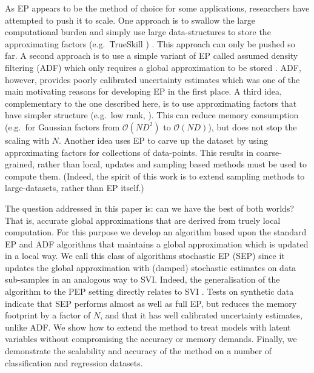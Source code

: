 As EP appears to be the method of choice for some applications, researchers have attempted to push it to scale. One approach is to swallow the large computational burden and simply use large data-structures to store the approximating factors (e.g.~TrueSkill \cite{herbrich:trueskill}) . This approach can only be pushed so far. A second approach is to use a simple variant of EP called assumed density filtering (ADF) which only requires a global approximation to be stored \cite{ADF}. ADF, however, provides poorly calibrated uncertainty estimates \cite{minka:ep} which was one of the main motivating reasons for developing EP in the first place. 
A third idea, complementary to the one described here, is to use approximating factors that have simpler structure (e.g.~low rank, \cite{qi+minka:gp paper}). This can reduce memory consumption (e.g.~for Gaussian factors from $\mathcal{O}(ND^2)$ to $\mathcal{O}(ND)$), but does not stop the scaling with $N$. Another idea uses EP to carve up the dataset \cite{gelman:dep,xu:sms} by using approximating factors for collections of data-points. This results in coarse-grained, rather than local, updates and sampling based methods must be used to compute them. (Indeed, the spirit of this work is to extend sampling methods to large-datasets, rather than EP itself.) 

The question addressed in this paper is: can we have the best of both worlds? That is, accurate global approximations that are derived from truely local computation. For this purpose we develop an algorithm based upon the standard EP and ADF algorithms that maintains a global approximation which is updated in a local way. We call this class of algorithms stochastic EP (SEP) since it updates the global approximation with (damped) stochastic estimates on data sub-samples in an analogous way to SVI. Indeed, the generalisation of the algorithm to the PEP setting directly relates to SVI \cite{hoffman:svi}. Tests on synthetic data indicate that SEP performs almost as well as full EP, but reduces the memory footprint by a factor of $N$, and that it has well calibrated uncertainty estimates, unlike ADF. We show how to extend the method to treat models with latent variables without compromising the accuracy or memory demands. Finally, we demonstrate the scalability and accuracy of the method on a number of classification and regression datasets.


